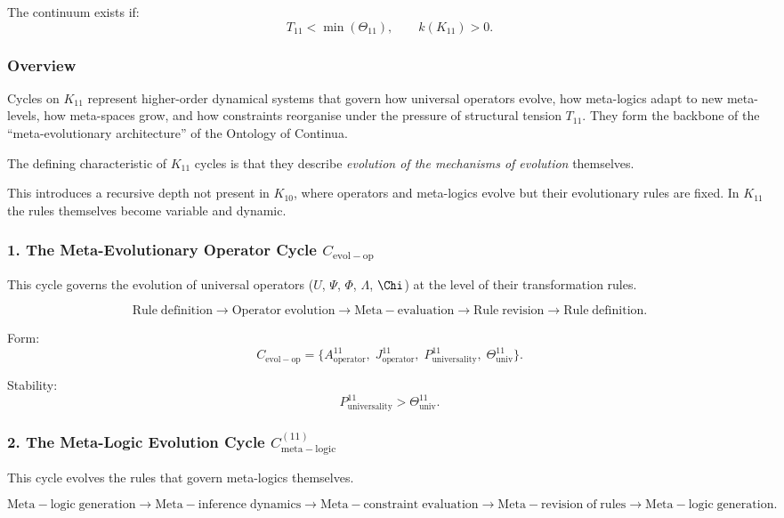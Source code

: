 The continuum exists if:
\[
  T_{11} < \min(\Theta_{11}), \qquad k(K_{11})>0.
\]


\subsubsection{Overview}

Cycles on $K_{11}$ represent higher-order dynamical systems that govern
how universal operators evolve, how meta-logics adapt to new meta-levels,
how meta-spaces grow, and how constraints reorganise under the pressure of
structural tension $T_{11}$. They form the backbone of the ``meta-evolutionary
architecture'' of the Ontology of Continua.

The defining characteristic of $K_{11}$ cycles is that they describe
\emph{evolution of the mechanisms of evolution} themselves.

This introduces a recursive depth not present in $K_{10}$, where operators
and meta-logics evolve but their evolutionary rules are fixed.  
In $K_{11}$ the rules themselves become variable and dynamic.


\subsubsection{1. The Meta-Evolutionary Operator Cycle $C_{\mathrm{evol-op}}$}

This cycle governs the evolution of universal operators ($U$, $\Psi$, $\Phi$,
$\Lambda$, $\Chi$) at the level of their transformation rules.

\[
  \mathrm{Rule\;definition}
  \to
  \mathrm{Operator\;evolution}
  \to
  \mathrm{Meta\!-\!evaluation}
  \to
  \mathrm{Rule\;revision}
  \to
  \mathrm{Rule\;definition}.
\]

Form:
\[
  C_{\mathrm{evol-op}}
  =
  \{
    A^{11}_{\mathrm{operator}},\;
    J^{11}_{\mathrm{operator}},\;
    P^{11}_{\mathrm{universality}},\;
    \Theta^{11}_{\mathrm{univ}}
  \}.
\]

Stability:
\[
  P^{11}_{\mathrm{universality}}>\Theta^{11}_{\mathrm{univ}}.
\]


\subsubsection{2. The Meta-Logic Evolution Cycle $C_{\mathrm{meta\!-\!logic}}^{(11)}$}

This cycle evolves the rules that govern meta-logics themselves.

\[
  \mathrm{Meta\!-\!logic\;generation}
  \to
  \mathrm{Meta\!-\!inference\;dynamics}
  \to
  \mathrm{Meta\!-\!constraint\;evaluation}
  \to
  \mathrm{Meta\!-\!revision\;of\;rules}
  \to
  \mathrm{Meta\!-\!logic\;generation}.
\]

